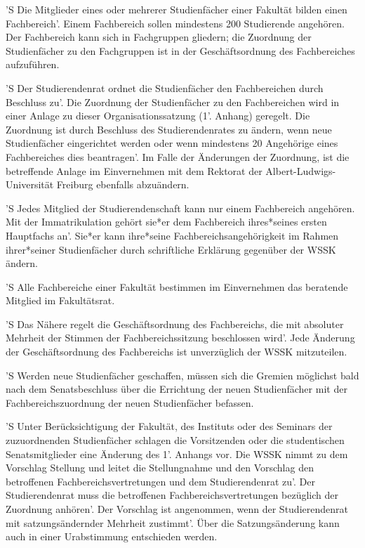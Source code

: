 \documentclass[fontsize=12pt,parskip=half]{scrartcl}
\begin{document}
\begin{contract}


  'S Die Mitglieder eines oder mehrerer Studienfächer einer Fakultät bilden einen
  Fachbereich'. Einem Fachbereich sollen mindestens 200 Studierende angehören.
  Der Fachbereich kann sich in Fachgruppen gliedern; die Zuordnung der
  Studienfächer zu den Fachgruppen ist in der Geschäftsordnung des Fachbereiches
  aufzuführen.

  'S Der Studierendenrat ordnet die Studienfächer den Fachbereichen durch Beschluss
  zu'. Die Zuordnung der Studienfächer zu den Fachbereichen wird in einer Anlage
  zu dieser Organisationssatzung (1'. Anhang) geregelt. Die Zuordnung ist durch
  Beschluss des Studierendenrates zu ändern, wenn neue Studienfächer
  eingerichtet werden oder wenn mindestens 20 Angehörige eines Fachbereiches
  dies beantragen'. Im Falle der Änderungen der Zuordnung, ist die betreffende
  Anlage im Einvernehmen mit dem Rektorat der Albert-Ludwigs-Universität
  Freiburg ebenfalls abzuändern.

  'S Jedes Mitglied der Studierendenschaft kann nur einem Fachbereich angehören.
  Mit der Immatrikulation gehört sie*er dem Fachbereich ihres*seines ersten
  Hauptfachs an'. Sie*er kann ihre*seine Fachbereichsangehörigkeit im Rahmen
  ihrer*seiner Studienfächer durch schriftliche Erklärung gegenüber der WSSK
  ändern.

  'S Alle Fachbereiche einer Fakultät bestimmen im Einvernehmen das beratende
  Mitglied im Fakultätsrat.

  'S Das Nähere regelt die Geschäftsordnung des Fachbereichs, die mit absoluter
  Mehrheit der Stimmen der Fachbereichssitzung beschlossen wird'. Jede Änderung
  der Geschäftsordnung des Fachbereichs ist unverzüglich der WSSK mitzuteilen.



  'S Werden neue Studienfächer geschaffen, müssen sich die Gremien möglichst bald
  nach dem Senatsbeschluss über die Errichtung der neuen Studienfächer mit der
  Fachbereichszuordnung der neuen Studienfächer befassen.

  'S Unter Berücksichtigung der Fakultät, des Instituts oder des Seminars der
  zuzuordnenden Studienfächer schlagen die Vorsitzenden oder die studentischen
  Senatsmitglieder eine Änderung des 1'. Anhangs vor. Die WSSK nimmt zu dem
  Vorschlag Stellung und leitet die Stellungnahme und den Vorschlag den
  betroffenen Fachbereichsvertretungen und dem Studierendenrat zu'. Der
  Studierendenrat muss die betroffenen Fachbereichsvertretungen bezüglich der
  Zuordnung anhören'. Der Vorschlag ist angenommen, wenn der Studierendenrat mit
  satzungsändernder Mehrheit zustimmt'. Über die Satzungsänderung kann auch in
  einer Urabstimmung entschieden werden.


\end{contract}
\end{document}
